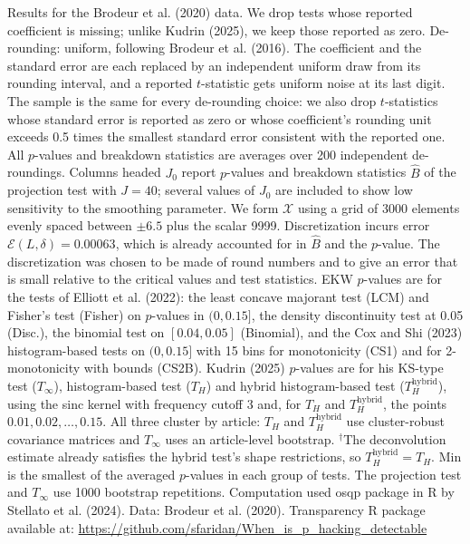 \begin{table}[htbp]
\medskip
\begin{minipage}{\linewidth}
Results for the Brodeur et al. (2020) data. We drop tests whose reported coefficient is missing; unlike Kudrin (2025), we keep those reported as zero.
De-rounding: uniform, following Brodeur et al. (2016). The coefficient and the standard error are each replaced by an independent uniform draw from its rounding interval, and a reported $t$-statistic gets uniform noise at its last digit.
The sample is the same for every de-rounding choice: we also drop $t$-statistics whose standard error is reported as zero or whose coefficient's rounding unit exceeds 0.5 times the smallest standard error consistent with the reported one.
All $p$-values and breakdown statistics are averages over 200 independent de-roundings.
Columns headed $J_0$ report $p$-values and breakdown statistics $\widehat{B}$ of the projection test with $J=40$; several values of $J_0$ are included to show low sensitivity to the smoothing parameter.
We form $\mathcal{X}$ using a grid of 3000 elements evenly spaced between $\pm 6.5$ plus the scalar 9999.
Discretization incurs error $\mathcal{E}(L,\delta)=0.00063$, which is already accounted for in $\widehat{B}$ and the $p$-value.
The discretization was chosen to be made of round numbers and to give an error that is small relative to the critical values and test statistics.
EKW $p$-values are for the tests of Elliott et al. (2022): the least concave majorant test (LCM) and Fisher's test (Fisher) on $p$-values in $(0,0.15]$, the density discontinuity test at 0.05 (Disc.), the binomial test on $[0.04,0.05]$ (Binomial), and the Cox and Shi (2023) histogram-based tests on $(0,0.15]$ with 15 bins for monotonicity (CS1) and for 2-monotonicity with bounds (CS2B).
Kudrin (2025) $p$-values are for his KS-type test ($T_\infty$), histogram-based test ($T_H$) and hybrid histogram-based test ($T_H^{\mathrm{hybrid}}$), using the sinc kernel with frequency cutoff 3 and, for $T_H$ and $T_H^{\mathrm{hybrid}}$, the points $0.01,0.02,\ldots,0.15$.
All three cluster by article: $T_H$ and $T_H^{\mathrm{hybrid}}$ use cluster-robust covariance matrices and $T_\infty$ uses an article-level bootstrap.
$^\dagger$The deconvolution estimate already satisfies the hybrid test's shape restrictions, so $T_H^{\mathrm{hybrid}}=T_H$.
Min is the smallest of the averaged $p$-values in each group of tests.
The projection test and $T_\infty$ use 1000 bootstrap repetitions.
Computation used osqp package in R by Stellato et al. (2024). Data: Brodeur et al. (2020).
Transparency R package available at: \url{https://github.com/sfaridan/When_is_p_hacking_detectable}
\end{minipage}
\end{table}
